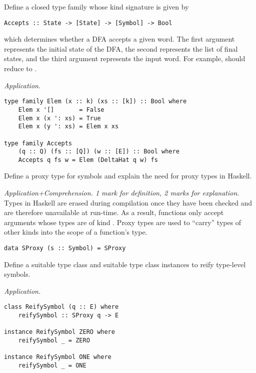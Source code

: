 \begin{parts}
\begin{subparts}
        \ifprintanswers \else \pagebreak \fi
    
        \subpart[8] Define a closed type family whose kind signature is given by 
        \vspace*{0.2cm}
\begin{verbatim}
Accepts :: State -> [State] -> [Symbol] -> Bool
\end{verbatim}
\vspace*{0.2cm}
        which determines whether a DFA accepts a given word. The first argument represents the initial state of the DFA, the second represents the list of final states, and the third argument represents the input word. For example,  should reduce to .
        \droppoints 
        
        \begin{solution}
            \emph{Application.}
\begin{verbatim}
type family Elem (x :: k) (xs :: [k]) :: Bool where 
    Elem x '[]       = False 
    Elem x (x ': xs) = True 
    Elem x (y ': xs) = Elem x xs

type family Accepts 
    (q :: Q) (fs :: [Q]) (w :: [E]) :: Bool where 
    Accepts q fs w = Elem (DeltaHat q w) fs
\end{verbatim}
        \end{solution}
        
        \subpart[3] Define a proxy type for symbols and explain the need for proxy types in Haskell. \droppoints 
        
        \begin{solution}
            \emph{Application+Comprehension. 1 mark for definition, 2 marks for explanation.} Types in Haskell are erased during compilation once they have been checked and are therefore unavailable at run-time. As a result, functions only accept arguments whose types are of kind \haskellIn{*}. Proxy types are used to ``carry'' types of other kinds into the scope of a function's type.
            
\begin{verbatim}
data SProxy (s :: Symbol) = SProxy
\end{verbatim}
        \end{solution}
        
        \subpart[4] Define a suitable type class and suitable type class instances to reify type-level symbols. \droppoints 
        
        \begin{solution}
            \emph{Application.} 
\begin{verbatim}
class ReifySymbol (q :: E) where 
    reifySymbol :: SProxy q -> E

instance ReifySymbol ZERO where 
    reifySymbol _ = ZERO 

instance ReifySymbol ONE where 
    reifySymbol _ = ONE
\end{verbatim}
        \end{solution}
        
    \end{subparts}
\end{parts}

